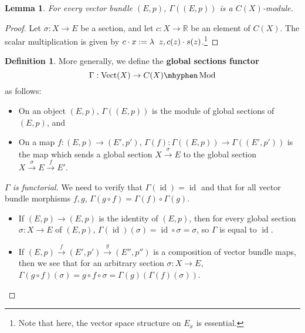 \documentclass[11pt]{article}
\newcommand{\R}{\mathbb{R}}
\newcommand{\Vect}{\operatorname{Vect}}
\newcommand{\Mod}{\mhyphen\operatorname{Mod}}
\newcommand{\id}{\operatorname{id}}
\theoremstyle{plain}
\newtheorem{lemma}{Lemma}[section]
\theoremstyle{definition}
\newtheorem{definition}{Definition}[section]
\begin{document}
\begin{lemma}\label{lemma-global-sections-module}
  For every vector bundle \((E,p)\), \(\Gamma((E,p))\) is a \(C(X)\)-module.
\end{lemma}
\begin{proof}
  Let \(\sigma : X \to E\) be a section, and let \(c : X \to \R\) be an element of \(C(X)\). The scalar multiplication is given by \(c \cdot x := \lambda \hspace{2mm} z, c(z) \cdot s(z)\).\footnote{Note that here, the vector space structure on \(E_x\) is essential.}
\end{proof}

\begin{definition}\label{def-global-sections-functor}
  More generally, we define the \textbf{global sections functor}
  \[\Gamma : \Vect(X) \to C(X)\Mod\]
  as follows:
  \begin{itemize}
  \item On an object \((E,p)\), \(\Gamma((E,p))\) is the module of global sections of \((E,p)\), and
    \item On a map \(f : (E,p) \to (E',p')\), \(\Gamma(f) : \Gamma((E,p)) \to \Gamma((E',p'))\) is the map which sends a global section \(X \overset{\sigma}{\to} E\) to the global section \(X \overset{\sigma}{\to} E \overset{f}{\to} E'\).
    \end{itemize}

    \begin{proof}[\(\Gamma\) is functorial]
      We need to verify that \(\Gamma(\id) = \id\) and that for all vector bundle morphisms \(f,g\), \(\Gamma(g \circ f) = \Gamma(f) \circ \Gamma(g)\).
      \begin{itemize}
      \item If \((E,p) \to (E,p)\) is the identity of \((E,p)\), then for every global section \(\sigma : X \to E\) of \((E,p)\), \(\Gamma(\id)(\sigma) = \id \circ \sigma = \sigma\), so \(\Gamma\) is equal to \(\id\).

        \item If \((E,p) \overset{f}{\to} (E',p') \overset{g}{\to} (E'', p'')\) is a composition of vector bundle maps, then we see that for an arbitrary section \(\sigma : X \to E\), \(\Gamma(g \circ f)(\sigma) = g \circ f \circ \sigma = \Gamma(g)(\Gamma(f)(\sigma))\).
      \end{itemize}
    \end{proof}


\end{definition}
\end{document}
